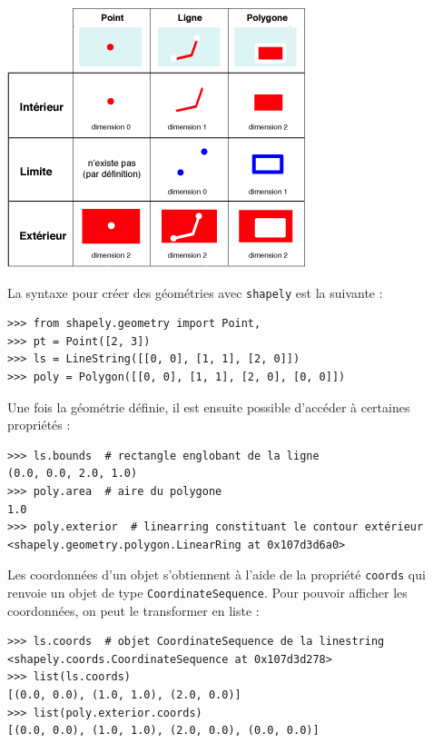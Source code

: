 \documentclass[11pt]{article}
\makeatletter
\newcommand{\passthrough}[1]{#1}
\let\origfigure=\figure
\let\endorigfigure=\endfigure
\renewenvironment{figure}[1][]{%
  \origfigure[H]
}{%
  \endorigfigure
}
\def\maxwidth{\ifdim \Gin@nat@width > 0.8\linewidth 0.8\linewidth \else \Gin@nat@width \fi}
\let\oldincludegraphics\includegraphics
\renewcommand{\includegraphics}[1]{\oldincludegraphics[width=\maxwidth]{#1}}
\makeatother
\begin{document}
\begin{figure}
\centering
\includegraphics{img/cours1/shapely_interieur_exterieur.png}
\caption{Notions d'intérieur et d'extérieur dans shapely}
\end{figure}

La syntaxe pour créer des géométries avec
\passthrough{\lstinline!shapely!} est la suivante :

\begin{lstlisting}
>>> from shapely.geometry import Point,
>>> pt = Point([2, 3])
>>> ls = LineString([[0, 0], [1, 1], [2, 0]])
>>> poly = Polygon([[0, 0], [1, 1], [2, 0], [0, 0]])
\end{lstlisting}

Une fois la géométrie définie, il est ensuite possible d'accéder à
certaines propriétés :

\begin{lstlisting}
>>> ls.bounds  # rectangle englobant de la ligne
(0.0, 0.0, 2.0, 1.0)
>>> poly.area  # aire du polygone
1.0
>>> poly.exterior  # linearring constituant le contour extérieur
<shapely.geometry.polygon.LinearRing at 0x107d3d6a0>
\end{lstlisting}

Les coordonnées d'un objet s'obtiennent à l'aide de la propriété
\passthrough{\lstinline!coords!} qui renvoie un objet de type
\passthrough{\lstinline!CoordinateSequence!}. Pour pouvoir afficher les
coordonnées, on peut le transformer en liste :

\begin{lstlisting}
>>> ls.coords  # objet CoordinateSequence de la linestring
<shapely.coords.CoordinateSequence at 0x107d3d278>
>>> list(ls.coords)
[(0.0, 0.0), (1.0, 1.0), (2.0, 0.0)]
>>> list(poly.exterior.coords)
[(0.0, 0.0), (1.0, 1.0), (2.0, 0.0), (0.0, 0.0)]
\end{lstlisting}
\end{document}

